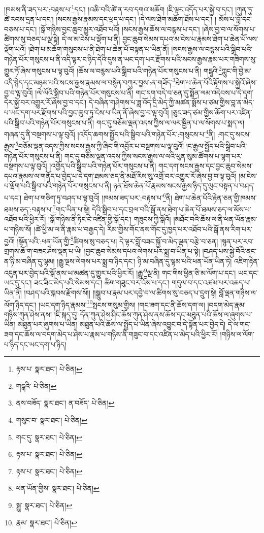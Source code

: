 །ཁམས་ནི་ཟད་པར་:བརྟས་པ་\footnote{རྟས་པ་  སྣར་ཐང་།  པེ་ཅིན། }དང་། །འཆི་བའི་ཚེ་ན་རབ་དགའ་མཆོག །ཇི་ལྟར་འདོད་པར་སྐྱེ་བ་དང་། །ཀུན་ཏུ་ཚེ་རབས་དྲན་པ་དང་། །སངས་རྒྱས་རྣམས་དང་ཕྲད་པ་དང་། །དེ་ལས་ཐེག་མཆོག་ཐོས་པ་དང་། །
མོས་པ་བློ་དང་བཅས་པ་དང་། །སྒོ་གཉིས་བྱང་ཆུབ་མྱུར་འཐོབ་པའོ། །སངས་རྒྱས་ཆོས་ལ་བརྙས་པ་དང་། །ཞེས་བྱ་བ་ལ་སོགས་པ་ཚིགས་སུ་བཅད་པ་ལྔ་སྟེ། དེ་ལ་མ་ངེས་པ་ལྡོག་པ་ནི། བྱང་ཆུབ་སེམས་དཔའ་མ་ངེས་པ་རྣམས་ཐེག་པ་ཆེན་པོ་ལས་ལྡོག་པའོ། །ཐེག་པ་མཆོག་གསུངས་པ་ནི་ཐེག་པ་ཆེན་པོ་བསྟན་པ་ཡིན་ནོ། །སངས་རྒྱས་ལ་བརྙས་པའི་སྒྲིབ་པའི་གཉེན་པོར་གསུངས་པ་ནི་འདི་ལྟར་ང་ཉིད་དེའི་དུས་ན་ཡང་དག་པར་རྫོགས་པའི་སངས་རྒྱས་རྣམ་པར་གཟིགས་སུ་གྱུར་ཏོ་ཞེས་གསུངས་པ་ལྟ་བུའོ། །ཆོས་ལ་བརྙས་པའི་སྒྲིབ་པའི་གཉེན་པོར་གསུངས་པ་ནི། གངྒཱའི་\footnote{གངྒའི་  པེ་ཅིན། }ཀླུང་གི་བྱེ་མ་འདི་སྙེད་དང་མཉམ་པའི་སངས་རྒྱས་རྣམས་ལ་བསྙེན་བཀུར་བྱས་:ན་གཟོད་\footnote{ནས་བཟོད་  སྣར་ཐང་། ན་བཟོད་  པེ་ཅིན། }ཐེག་པ་ཆེན་པོའི་རྟོགས་པ་སྐྱེའོ་ཞེས་བྱ་བ་ལྟ་བུའོ། །ལེ་ལོའི་སྒྲིབ་པའི་གཉེན་པོར་གསུངས་པ་ནི། གང་དག་བདེ་བ་ཅན་དུ་སྨོན་ལམ་འདེབས་པ་དེ་དག་དེར་སྐྱེ་བར་འགྱུར་རོ་ཞེས་བྱ་བ་དང་། དེ་བཞིན་གཤེགས་པ་ཟླ་འོད་དྲི་མེད་ཀྱི་མཚན་སྨོས་པ་ཙམ་གྱིས་བླ་ན་མེད་པ་ཡང་དག་པར་རྫོགས་པའི་བྱང་ཆུབ་ཏུ་ངེས་པ་ཡིན་ནོ་ཞེས་བྱ་བ་ལྟ་བུའོ། །ཅུང་ཟད་ཙམ་གྱིས་ཆོག་པར་འཛིན་པའི་སྒྲིབ་པའི་གཉེན་པོར་གསུངས་པ་ནི། གང་དུ་བཅོམ་ལྡན་འདས་ཀྱིས་ལ་ལར་སྦྱིན་པ་ལ་སོགས་པ་སྨད་ལ། གཞན་དུ་ནི་བསྔགས་པ་ལྟ་བུའོ། །འདོད་ཆགས་སྤྱོད་པའི་སྒྲིབ་པའི་གཉེན་པོར་:གསུངས་པ་\footnote{གསུང་བ་  སྣར་ཐང་།  པེ་ཅིན། }ནི། :གང་དུ་སངས་རྒྱས་\footnote{གང་དུ་  སྣར་ཐང་།  པེ་ཅིན། }བཅོམ་ལྡན་འདས་ཀྱིས་སངས་རྒྱས་ཀྱི་ཞིང་གི་འབྱོར་པ་བསྔགས་པ་ལྟ་བུའོ། །ང་རྒྱལ་སྤྱོད་པའི་སྒྲིབ་པའི་གཉེན་པོར་གསུངས་པ་ནི། གང་དུ་བཅོམ་ལྡན་འདས་ཀྱིས་སངས་རྒྱས་ལ་ལའི་ཕུན་སུམ་ཚོགས་པ་ལྷག་པར་བསྔགས་པ་ལྟ་བུའོ། །འགྱོད་པའི་སྒྲིབ་པའི་གཉེན་པོར་གསུངས་པ་ནི། གང་དག་སངས་རྒྱས་དང་བྱང་ཆུབ་སེམས་དཔའ་རྣམས་ལ་གནོད་པ་བྱེད་པ་དེ་དག་ཐམས་ཅད་ནི་མཐོ་རིས་སུ་འགྲོ་བར་འགྱུར་རོ་ཞེས་བྱ་བ་ལྟ་བུའོ། །མ་ངེས་པ་ལྡོག་པའི་སྒྲིབ་པའི་གཉེན་པོར་གསུངས་པ་ནི། ཉན་ཐོས་ཆེན་པོ་རྣམས་སངས་རྒྱས་ཉིད་དུ་ལུང་བསྟན་པ་བཤད་པ་དང་། ཐེག་པ་གཅིག་ཏུ་བཤད་པ་ལྟ་བུའོ། །ཁམས་ཟད་པར་:བརྟས་པ་\footnote{རྟས་པ་  སྣར་ཐང་།  པེ་ཅིན། }ནི། ཐེག་པ་ཆེན་པོའི་རྟེན་ཅན་གྱི་ཁམས་ཐམས་ཅད་:བརྟས་པ་\footnote{རྟས་པ་  སྣར་ཐང་།  པེ་ཅིན། }གང་ཡིན་པ་སྟེ། དེའི་སྒྲིབ་པ་དང་བྲལ་བའི་སྒོ་ནས་ཐེག་པ་ཆེན་པོ་ཐམས་ཅད་ལ་མོས་པ་འཐོབ་པའི་ཕྱིར་རོ། །སྒོ་གཉིས་ནི་ཏིང་ངེ་འཛིན་གྱི་སྒོ་དང་། གཟུངས་ཀྱི་སྒོའོ། །མཐོང་བའི་ཆོས་ལ་ནི་ཕན་ཡོན་རྣམ་པ་གཉིས་སོ། །ཚེ་ཕྱི་མ་ལ་ནི་རྣམ་པ་བརྒྱད་དེ། རིམ་གྱིས་གོང་ནས་གོང་དུ་ཁྱད་པར་འཐོབ་པའི་སྒོ་ནས་རིག་པར་བྱའོ། །སྟོན་པའི་:ཕན་ཡོན་གྱི་\footnote{ཕན་ཡོན་གྱིས་  སྣར་ཐང་།  པེ་ཅིན། }ཚིགས་སུ་བཅད་པ། དེ་ལྟར་བློ་བཟང་སྐྱོ་བ་མེད་ལྡན་བརྩེ་བ་ཅན། །སྙན་པར་རབ་གྲགས་ཆོ་ག་བཟང་ཤེས་ལྡན་པ་ཡི། །བྱང་ཆུབ་སེམས་དཔའ་ལེགས་པར་སྨྲ་བ་ཡིན་པ་སྟེ། །བཤད་པས་སྐྱེ་བོའི་ནང་ན་ཉི་མ་བཞིན་དུ་ལྷམ། །རྒྱུ་ལྔས་ལེགས་པར་སྨྲ་བ་ཉིད་དང་། ཉི་མ་བཞིན་དུ་ལྷམ་པའི་ཕན་ཡོན་ཡིན་ཏེ། འཇིག་རྟེན་འདུན་པར་བྱེད་པའི་སྒོ་ནས་ཡ་མཚན་དུ་གྱུར་པའི་ཕྱིར་རོ། །རྒྱུ་\footnote{སྒྱུ་  སྣར་ཐང་།  པེ་ཅིན། }ལྔ་ནི། གང་གིས་ཕྱིན་ཅི་མ་ལོག་པ་དང་། ཡང་དང་ཡང་དུ་དང་། ཟང་ཟིང་མེད་པའི་སེམས་དང་། ཚིག་གཟུང་བར་འོས་པ་དང་། གདུལ་བ་དང་འཚམ་པར་འཆད་པ་ཡིན་ནོ། །བཤད་པའི་སྐབས་རྫོགས་སོ།། །།སྒྲུབ་པ་རྣམ་པར་དབྱེ་བ་ལ་ཚིགས་སུ་བཅད་པ་དྲུག་སྟེ། བློ་ལྡན་གཉིས་ལ་ལོག་ཉིད་དང་། །ཡང་དག་ཉིད་རྣམས་\footnote{རྣམ་  སྣར་ཐང་།  པེ་ཅིན། }སྤངས་གསུམ་གྱིས། །གང་ཟག་དང་ནི་ཆོས་དག་ལ། །བདག་མེད་རྣམ་གཉིས་ཀུན་ཤེས་ནས། །ཇི་སྐད་དུ། དོན་ཀུན་ཤེས་ཤིང་ཆོས་ཀུན་ཤེས་ནས་ཆོས་དང་མཐུན་པའི་ཆོས་ལ་ཞུགས་པ་ཡིན། མཐུན་པར་ཞུགས་པ་ཡིན། མཐུན་པའི་ཆོས་ལ་སྤྱོད་པ་ཡིན་ཞེས་འབྱུང་བ་དེ་སྟོན་པར་བྱེད་དེ། དེ་ལ་གང་ཟག་དང་ཆོས་ལ་བདག་མེད་པ་ཤེས་པ་རྣམ་པ་གཉིས་ནི་གཟུང་བ་དང་འཛིན་པ་མེད་པའི་ཕྱིར་རོ། །གཉིས་ལ་ལོག་པ་ཉིད་དང་ཡང་དག་པ་ཉིད། 